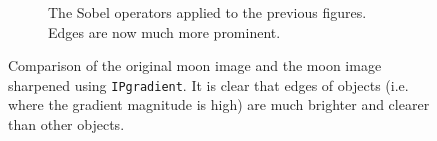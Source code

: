 \begin{figure}[!Hbt]
\begin{subfigure}[b]{0.45\textwidth}
  \caption{The Sobel operators applied to the previous figures. Edges are now much more prominent.}
  \label{fig:moonSharp}
 \end{subfigure}
 \caption{Comparison of the original moon image and the moon image sharpened using \texttt{IPgradient}. It is clear that edges of objects (i.e. where the gradient magnitude is high) are much brighter and clearer than other objects.}
 \label{fig:moon}
\end{figure}
